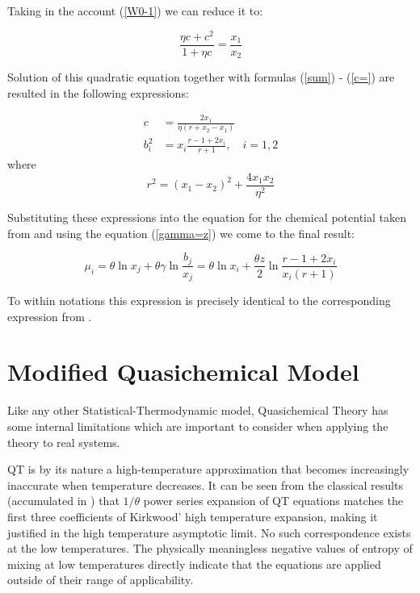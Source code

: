 \documentclass[12pt,abstract]{scrartcl}
\begin{document}
Taking in the account (\ref{W0-1}) we can reduce it to:

\[
\frac{\eta c + c^2}{1 + \eta c} = \frac{ x_1}{x_2}
\]


Solution of this quadratic equation together with formulas  (\ref{sum}) - (\ref{c=})  are resulted in the following expressions:

\begin{equation} \label{cb}
\begin{split}
c &= \frac{2 x_1}{\eta (r + x_2 - x_1)}\\
b_i^2 &= x_i \frac{r -1 + 2 x_i}{r + 1}, \quad i = 1, 2
\end{split}
\end{equation}
where
\[
r^2 = (x_1 - x_2)^2 + \frac{4 x_1 x_2}{\eta^2}
\]


Substituting these expressions into the equation for the chemical potential taken from \cite{TISR_p1} and using the equation (\ref{gamma=z}) we come to the final result:

\begin{equation}
\mu_i =   \theta \ln x_j + \theta \gamma \ln \frac{b_j}{x_j} = \theta \ln x_i + \frac{\theta z}{2} \ln \frac{r - 1 + 2 x_i}{x_i (r+1)}
\end{equation}

To within notations this expression is precisely identical to the corresponding expression from \cite{GUGGENHEIM1952}.



\section{Modified Quasichemical Model}

Like  any other  Statistical-Thermodynamic model, Quasichemical Theory has some internal limitations which are important to consider when applying the theory to real systems.

 QT is by its nature a high-temperature approximation that  becomes increasingly inaccurate when temperature decreases. It can be seen from the classical results (accumulated in \cite{GUGGENHEIM1952})  that
 $1/\theta$ power series expansion of QT equations    matches  the first three  coefficients of Kirkwood' high temperature expansion, making it justified in the high temperature asymptotic limit. No such correspondence exists at the low temperatures. The physically meaningless negative values of entropy of mixing  at low temperatures \cite{Hillert2008} directly indicate that the equations are applied outside of their  range of applicability.
\end{document}
